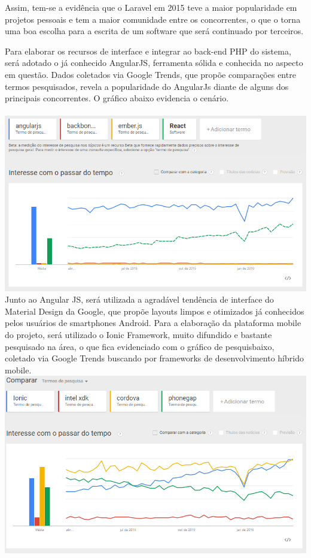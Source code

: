 Assim, tem-se a evidência que o Laravel em 2015 teve a maior popularidade em projetos pessoais e tem a maior comunidade entre os concorrentes, o que o torna uma boa escolha para a escrita de um software que será continuado por terceiros.

Para elaborar os recursos de interface e integrar ao back-end PHP do sistema, será adotado o já conhecido AngularJS, ferramenta sólida e conhecida no aspecto em questão. 
Dados coletados via Google Trends, que propõe comparações entre termos pesquisados, revela a popularidade do AngularJs diante de alguns dos principais concorrentes. O gráfico abaixo evidencia o cenário.\\ \\
\includegraphics[width=17cm]{img/grafico_ferramentas_front}
Junto ao Angular JS, será utilizada a agradável tendência de interface do Material Design da Google, que propõe layouts limpos e otimizados já conhecidos pelos usuários de smartphones Android. 
Para a elaboração da plataforma mobile do projeto, será utilizado o Ionic Framework, muito difundido e bastante pesquisado na área, o que fica evidenciado com o gráfico de pesquisbaixo, coletado via Google Trends buscando por frameworks de desenvolvimento híbrido mobile. \\
\includegraphics[width=17cm]{img/grafico_ferramentas_hibridas_mobile} \\

